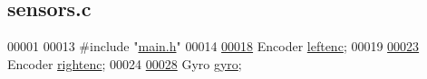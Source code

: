 \hypertarget{sensors_8c_source}{}\subsection{sensors.\+c}
\label{sensors_8c_source}

\begin{DoxyCode}
00001 
00013 \textcolor{preprocessor}{#include "\hyperlink{main_8h}{main.h}"}
00014 
\hypertarget{sensors_8c_source.tex_l00018}{}\hyperlink{sensors_8h_a48ead63071a2b65b87a166928a5a5c08}{00018} Encoder \hyperlink{sensors_8c_a48ead63071a2b65b87a166928a5a5c08}{leftenc};
00019 
\hypertarget{sensors_8c_source.tex_l00023}{}\hyperlink{sensors_8h_a8c853ba918673c4878ab6935c54969e4}{00023} Encoder \hyperlink{sensors_8c_a8c853ba918673c4878ab6935c54969e4}{rightenc};
00024 
\hypertarget{sensors_8c_source.tex_l00028}{}\hyperlink{sensors_8h_ad2d059cd4baeedd5fbead13085953eed}{00028} Gyro \hyperlink{sensors_8c_ad2d059cd4baeedd5fbead13085953eed}{gyro};
\end{DoxyCode}

